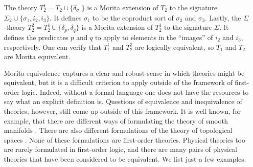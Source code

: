 \begin{example}
The theory $T_2^1=T_2\cup\{\delta_{\sigma_1}\}$ is a Morita extension
of $T_2$ to the signature $\Sigma_2\cup\{\sigma_1, i_2, i_3\}$. It
defines $\sigma_1$ to be the coproduct sort of $\sigma_2$ and
$\sigma_3$. Lastly, the $\Sigma$-theory
$T_2^2=T_2^1\cup\{\delta_p, \delta_q\}$ is a Morita extension of
$T_2^1$ to the signature $\Sigma$. It defines the predicates $p$ and
$q$ to apply to elements in the ``images'' of $i_2$ and $i_3$,
respectively.  One can verify that $T_1^1$ and $T_2^2$ are logically
equivalent, so $T_1$ and $T_2$ are Morita equivalent.
\end{example}

Morita equivalence captures a clear and robust sense in which theories
might be equivalent, but it is a difficult criterion to apply outside
of the framework of first-order logic. Indeed, without a formal
language one does not have the resources to say what an explicit
definition is. Questions of equivalence and inequivalence of theories,
however, still come up outside of this framework. It is well known,
for example, that there are different ways of formulating the theory
of smooth manifolds \citep{nestruev2002}. There are also different
formulations of the theory of topological spaces
\citep{kuratowski1966}.  None of these formulations are first-order
theories.  Physical theories too are rarely formulated in first-order
logic, and there are many pairs of physical theories that have been
considered to be equivalent.  We list just a few examples.


